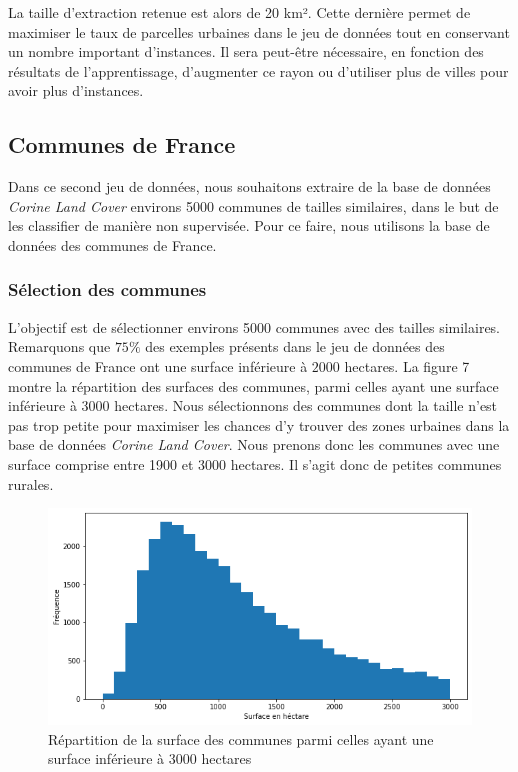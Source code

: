 La taille d'extraction retenue est alors de 20 km².
Cette dernière permet de maximiser le taux de parcelles urbaines dans le jeu de données tout en conservant un nombre important d'instances.
Il sera peut-être nécessaire, en fonction des résultats de l'apprentissage, d'augmenter ce rayon ou d'utiliser plus de villes pour avoir plus d'instances.

\subsection{Communes de France}

Dans ce second jeu de données, nous souhaitons extraire de la base de données \emph{Corine Land Cover} environs 5000 communes de tailles similaires, dans le but de les classifier de manière non supervisée.
Pour ce faire, nous utilisons la base de données des communes de France.

\subsubsection{Sélection des communes}

L'objectif est de sélectionner environs 5000 communes avec des tailles similaires.
Remarquons que $75\%$ des exemples présents dans le jeu de données des communes de France ont une surface inférieure à $2000$ hectares.
La figure 7 montre la répartition des surfaces des communes, parmi celles ayant une surface inférieure à $3000$ hectares.
Nous sélectionnons des communes dont la taille n'est pas trop petite pour maximiser les chances d'y trouver des zones urbaines dans la base de données \emph{Corine Land Cover}.
Nous prenons donc les communes avec une surface comprise entre 1900 et 3000 hectares.
Il s'agit donc de petites communes rurales.

\begin{figure}
    \centering
    \includegraphics[scale=0.5]{figures/surf-communes}
    \caption{Répartition de la surface des communes parmi celles ayant une surface inférieure à 3000 hectares}
\end{figure}

